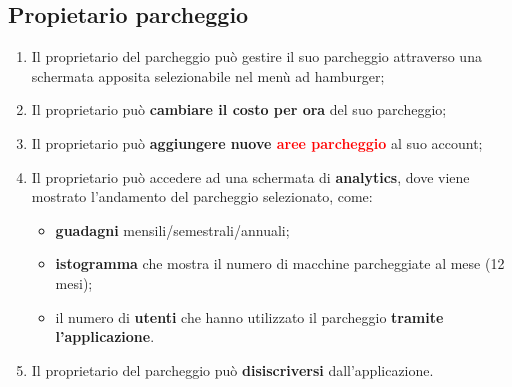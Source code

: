 \subsection*{Propietario parcheggio}
\begin{enumerate}[start=13,label={\bfseries RF\arabic*}]
    \item \label{itm:RF13}Il proprietario del parcheggio può gestire il suo parcheggio attraverso una schermata apposita selezionabile nel menù ad hamburger; 
    \item \label{itm:RF14}Il proprietario può \textbf{cambiare il costo per ora} del suo parcheggio;
    \item \label{itm:RF15}Il proprietario può \textbf{aggiungere nuove \textcolor{red}{aree parcheggio}} al suo account;
    \item \label{itm:RF16}Il proprietario può accedere ad una schermata di \textbf{analytics}, dove viene mostrato l’andamento del parcheggio selezionato, come: 
    \begin{itemize}
        \item \textbf{guadagni} mensili/semestrali/annuali;
        \item \textbf{istogramma} che mostra il numero di macchine parcheggiate al mese (12 mesi);
        \item il numero di \textbf{utenti} che hanno utilizzato il parcheggio \textbf{tramite l’applicazione}.
    \end{itemize}
    \item \label{itm:RF17}Il proprietario del parcheggio può \textbf{disiscriversi} dall’applicazione.
\end{enumerate}

